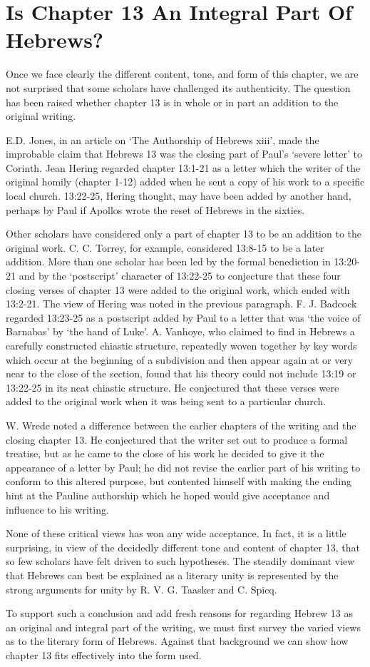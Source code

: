 \section{Is Chapter 13 An Integral Part Of Hebrews?}
Once we face clearly the different content, tone, and form of this chapter, we
are not surprised that some scholars have challenged its authenticity.
The question has been raised whether chapter 13 is in whole or in part an
addition to the original writing.

E.D. Jones, in an article on `The Authorship of Hebrews xiii', made the
improbable claim that Hebrews 13 was the closing part of Paul's `severe letter'
to Corinth.
Jean Hering regarded chapter 13:1-21 as a letter which the writer of the
original homily (chapter 1-12) added when he sent a copy of his work to a
specific local church.
13:22-25, Hering thought, may have been added by another hand, perhaps by Paul
if Apollos wrote the reset of Hebrews in the sixties.

Other scholars have considered only a part of chapter 13 to be an addition to
the original work.
C. C. Torrey, for example, considered 13:8-15 to be a later addition.
More than one scholar has been led by the formal benediction in 13:20-21 and
by the `postscript' character of 13:22-25 to conjecture that these four closing
verses of chapter 13 were added to the original work, which ended with 13:2-21.
The view of Hering was noted in the previous paragraph.
F. J. Badcock regarded 13:23-25 as a postscript added by Paul to a letter that
was `the voice of Barnabas' by `the hand of Luke'.
A. Vanhoye, who claimed to find in Hebrews a carefully constructed chiastic
structure, repeatedly woven together by key words which occur at the beginning
of a subdivision and then appear again at or very near to the close of the
section, found that his theory could not include 13:19 or 13:22-25 in its neat
chiastic structure.
He conjectured that these verses were added to the original work when it was
being sent to a particular church.

W. Wrede noted a difference between the earlier chapters of the writing and the
closing chapter 13.
He conjectured that the writer set out to produce a formal treatise, but as he
came to the close of his work he decided to give it the appearance of a letter
by Paul; he did not revise the earlier part of his writing to conform to this
altered purpose, but contented himself with making the ending hint at the
Pauline authorship which he hoped would give acceptance and influence to his
writing.

None of these critical views has won any wide acceptance.
In fact, it is a little surprising, in view of the decidedly different tone and
content of chapter 13, that so few scholars have felt driven to such hypotheses.
The steadily dominant view that Hebrews can best be explained as a literary
unity is represented by the strong arguments for unity by R. V. G. Taasker and
C. Spicq.

To support such a conclusion and add fresh reasons for regarding Hebrew 13 as an
original and integral part of the writing, we must first survey the varied views
as to the literary form of Hebrews.
Against that background we can show how chapter 13 fits effectively into the
form used.
